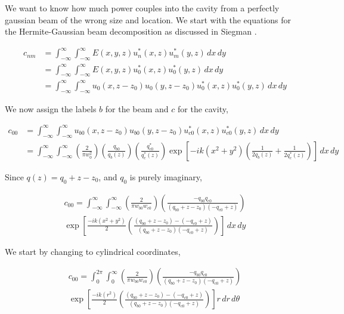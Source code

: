 We want to know how much power couples into the cavity from a
perfectly gaussian beam of the wrong size and location. We start with
the equations for the Hermite-Gaussian beam decomposition as discussed in
Siegman \cite{Siegman86}. 

\newcommand{\intinfxy}[1]{\int^{\infty}_{- \infty} \int^{\infty}_{- \infty} #1 \,dx \,dy}
\newcommand{\intinfrt}[1]{\int^{2 \pi}_{0} \int^{\infty}_{0} #1 r \,dr \,d\theta}


\begin{align}
    c_{nm} &= \intinfxy{
    E(x,y,z) u_n^*(x,z)u_m^*(y,z)} \nonumber
\\  &= \intinfxy{
    E(x,y,z) u_0^*(x,z)u_0^*(y,z)} \nonumber
\\  &= \intinfxy{
    u_0(x,z-z_0)u_0(y,z-z_0) u_0^*(x,z)u_0^*(y,z)}
\end{align}

We now assign the labels $b$ for the beam and $c$ for the cavity,

\begin{align}
    c_{00} &= \intinfxy{
    u_{b0}(x,z-z_0)u_{b0}(y,z-z_0) u_{c0}^*(x,z)u_{c0}^*(y,z)} \nonumber
\\  &= \intinfxy{ \left( \frac{2}{\pi w^2_0} \right) \left( \frac{q_{b0}}{q_{b}(z)} \right)
    \left( \frac{q^*_{c0}}{q^*_{c}(z)} \right) \exp \left[-ik \left( x^2 + y^2  \right)
    \left( \frac{1}{2q_b(z)} + \frac{1}{2q^*_c(z)} \right) \right]}
\end{align}

Since $q(z) = q_0 + z - z_0$, and $q_0$ is purely imaginary,


\begin{multline}
    c_{00} = \intinfxy{ \left( \frac{2}{\pi w_{b0} w_{c0}} \right)
    \left( \frac{- q_{b0} q_{c0}}{(q_{b0}+z-z_0)(-q_{c0}+z)} \right) \\
    \exp \left[
    \frac{-ik \left( x^2 + y^2  \right)}{2} \left( \frac{(q_{b0}+z-z_0)-(-q_{c0}+z)}{(q_{b0}+z-z_0)(-q_{c0}+z)} \right)
    \right]}
\end{multline}

We start by changing to cylindrical coordinates,

\begin{multline}
    c_{00} = \intinfrt{ \left( \frac{2}{\pi w_{b0} w_{c0}} \right)
    \left( \frac{- q_{b0} q_{c0}}{(q_{b0}+z-z_0)(-q_{c0}+z)} \right) \\
    \exp \left[
    \frac{-ik \left( r^2  \right)}{2} \left( \frac{(q_{b0}+z-z_0)-(-q_{c0}+z)}{(q_{b0}+z-z_0)(-q_{c0}+z)} \right)
    \right]}
\end{multline}

